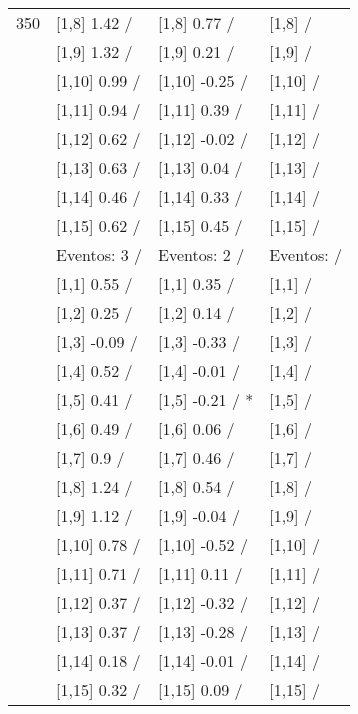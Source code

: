 \begin{table}
\begin{tabular}[t]{llll}
350 & {}[1,8] 1.42  / & {}[1,8] 0.77  / & {}[1,8]  /\\
\addlinespace
 & {}[1,9] 1.32  / & {}[1,9] 0.21  / & {}[1,9]  /\\
 & {}[1,10] 0.99  / & {}[1,10] -0.25  / & {}[1,10]  /\\
 & {}[1,11] 0.94  / & {}[1,11] 0.39  / & {}[1,11]  /\\
 & {}[1,12] 0.62  / & {}[1,12] -0.02  / & {}[1,12]  /\\
 & {}[1,13] 0.63  / & {}[1,13] 0.04  / & {}[1,13]  /\\
\addlinespace
 & {}[1,14] 0.46  / & {}[1,14] 0.33  / & {}[1,14]  /\\
 & {}[1,15] 0.62  / & {}[1,15] 0.45  / & {}[1,15]  /\\
 & Eventos:  3 / & Eventos:  2 / & Eventos:   /\\
 & {}[1,1] 0.55  / & {}[1,1] 0.35  / & {}[1,1]  /\\
 & {}[1,2] 0.25  / & {}[1,2] 0.14  / & {}[1,2]  /\\
\addlinespace
 & {}[1,3] -0.09  / & {}[1,3] -0.33  / & {}[1,3]  /\\
 & {}[1,4] 0.52  / & {}[1,4] -0.01  / & {}[1,4]  /\\
 & {}[1,5] 0.41  / & {}[1,5] -0.21  / * & {}[1,5]  /\\
 & {}[1,6] 0.49  / & {}[1,6] 0.06  / & {}[1,6]  /\\
 & {}[1,7] 0.9  / & {}[1,7] 0.46  / & {}[1,7]  /\\
\addlinespace
500 & {}[1,8] 1.24  / & {}[1,8] 0.54  / & {}[1,8]  /\\
 & {}[1,9] 1.12  / & {}[1,9] -0.04  / & {}[1,9]  /\\
 & {}[1,10] 0.78  / & {}[1,10] -0.52  / & {}[1,10]  /\\
 & {}[1,11] 0.71  / & {}[1,11] 0.11  / & {}[1,11]  /\\
 & {}[1,12] 0.37  / & {}[1,12] -0.32  / & {}[1,12]  /\\
\addlinespace
 & {}[1,13] 0.37  / & {}[1,13] -0.28  / & {}[1,13]  /\\
 & {}[1,14] 0.18  / & {}[1,14] -0.01  / & {}[1,14]  /\\
 & {}[1,15] 0.32  / & {}[1,15] 0.09  / & {}[1,15]  /\\
\bottomrule
\end{tabular}
\end{table}
